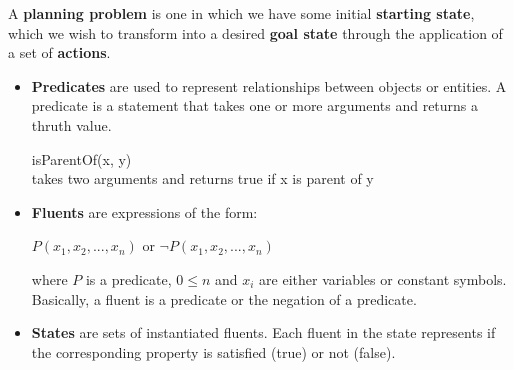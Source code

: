 \documentclass{article}
\begin{document}
A \textbf{planning problem} is one in which we have some initial \textbf{starting state}, which we wish to transform into a desired \textbf{goal state} through the application of a set of \textbf{actions}. \\

\newpage

\begin{comment}

A \textbf{fluent} is a variable or predicate that represents a condition or state of the world in a problem domain. For example, in a robotic vacuum cleaner domain, one possible fluent could be the "location" of the vacuum cleaner and it could have different values such as "kitchen", "living room", "bedroom", etc. depending on where the vacuum cleaner is currently located. Fluents are used in planning to define the preconditions and effects of action schemas. \\

\begin{center}
    \textbf{A fluent is a condition that can change over time.}
\end{center}

A set of instantiated fluents is called a \textbf{state}. According to the \textbf{close world assumption}, a state contains only positive fluents; all the missing ones are assumed to be false. \\

\begin{center}
    \textbf{A state (factor representation) is a set of fluents.}
\end{center}

\end{comment}

\begin{itemize}
    \item \textbf{Predicates} are used to represent relationships between objects or entities. A predicate is a statement that takes one or more arguments and returns a thruth value. 

    \begin{center}
        isParentOf(x, y) \\
    
        takes two arguments and returns true if x is parent of y
    \end{center}
    \item \textbf{Fluents} are expressions of the form:

    \begin{center}
        $P(x_1, x_2, ..., x_n)$ or $\neg P(x_1, x_2, ..., x_n)$
    \end{center}
    
    where $P$ is a predicate, $0 \leq n$ and $x_i$ are either variables or constant symbols. Basically, a fluent is a predicate or the negation of a predicate.
    \item \textbf{States} are sets of instantiated fluents. Each fluent in the state represents if the corresponding property is satisfied (true) or not (false).
\end{itemize}
\end{document}
